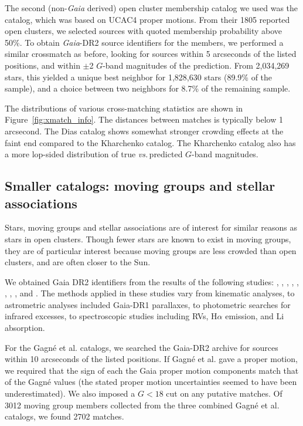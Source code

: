 \documentclass[12pt,twocolumn,tighten]{aastex62}
\begin{document}
The second (non-{\it Gaia} derived) open cluster membership catalog we
used was the \citet{dias_proper_2014} catalog, which was based on
UCAC4 proper motions.
From their 1805 reported open clusters, we selected sources with
quoted membership probability above 50\%.
To obtain {\it Gaia}-DR2 source identifiers for the members, we
performed a similar crossmatch as before, looking for sources within 5
arcseconds of the listed positions, and within $\pm$2 $G$-band
magnitudes of the prediction.
From 2{,}034{,}269 stars, this yielded a unique
best neighbor for 1{,}828{,}630 stars (89.9\% of the sample), and a choice
between two neighbors for 8.7\% of the remaining sample. 

The distributions of various cross-matching statistics are shown in
Figure~\ref{fig:xmatch_info}.  The distances between matches is
typically below 1 arcsecond.  The Dias catalog shows somewhat stronger
crowding effects at the faint end compared to the Kharchenko catalog.
The Kharchenko catalog also has a more lop-sided distribution of true
{\it vs.}$\,$predicted $G$-band magnitudes.


\subsection{Smaller catalogs: moving groups and stellar associations}
\label{subsec:mg}

Stars, moving groups and stellar associations are of interest for
similar reasons as stars in open clusters.  Though fewer stars
are known to exist in moving groups, they are of particular interest
because moving groups are less crowded than open clusters, and are
often closer to the Sun.

We obtained Gaia DR2 identifiers from the results of the following
studies:
\citet{gagne_banyan_XI_2018},
\citet{gagne_banyan_XII_2018},
\citet{gagne_banyan_XIII_2018},
\citet{kraus_tucanahor_2014},
\citet{roser_deep_2011}, %
\citet{bell_32ori_2017},
\citet{rizzuto_multidimensional_2011},
\citet{oh_comoving_2017}, and
\citet{zari_3d_2018}. The methods applied in these studies
vary from kinematic analyses, to astrometric analyses included
Gaia-DR1 parallaxes, to photometric searches for infrared excesses, to
spectroscopic studies including RVs, H$\alpha$
emission, and Li absorption.

For the Gagn\'e et al{.} catalogs, we searched the Gaia-DR2 archive for
sources within 10 arcseconds of the listed positions.  If Gagn\'e et
al{.} gave a proper motion, we required that the sign of each the Gaia
proper motion components match that of the Gagn\'e values (the stated
proper motion uncertainties seemed to have been underestimated).  We
also imposed a $G<18$ cut on any putative matches.  Of 3012 moving
group members collected from the three combined Gagn\'e et al{.}
catalogs, we found 2702 matches.
\end{document}

